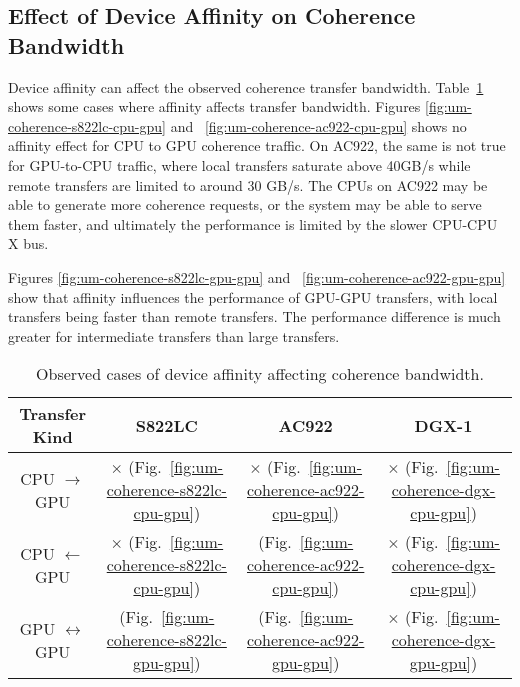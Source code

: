 \subsection{Effect of Device Affinity on Coherence Bandwidth}

Device affinity can affect the observed coherence transfer bandwidth.
Table~\ref{tab:um-coherence-affinity} shows some cases where affinity affects transfer bandwidth.
Figures \ref{fig:um-coherence-s822lc-cpu-gpu} and ~\ref{fig:um-coherence-ac922-cpu-gpu} shows no affinity effect for CPU to GPU coherence traffic.
On AC922, the same is not true for GPU-to-CPU traffic, where local transfers saturate above 40GB/s while remote transfers are limited to around 30 GB/s.
The CPUs on AC922 may be able to generate more coherence requests, or the system may be able to serve them faster, and ultimately the performance is limited by the slower CPU-CPU X bus.

Figures \ref{fig:um-coherence-s822lc-gpu-gpu} and ~\ref{fig:um-coherence-ac922-gpu-gpu} show that affinity influences the performance of GPU-GPU transfers, with local transfers being faster than remote transfers.
The performance difference is much greater for intermediate transfers than large transfers.

\begin{table}[ht]
	\centering
	\caption[Device Affinity and Coherence Bandwidth]{
		Observed cases of device affinity affecting coherence bandwidth.
	}
	\label{tab:um-coherence-affinity}
	\begin{tabular}{|c|c|c|c|}
		\hline
		\textbf{Transfer Kind}    & \textbf{S822LC}                                         & \textbf{AC922}                                         & \textbf{DGX-1}                            \\ \hline 
		CPU $\rightarrow$     GPU & $\times$   (Fig.~\ref{fig:um-coherence-s822lc-cpu-gpu}) & $\times$   (Fig.~\ref{fig:um-coherence-ac922-cpu-gpu}) & $\times$ (Fig.~\ref{fig:um-coherence-dgx-cpu-gpu}) \\ \hline
		CPU $\leftarrow$      GPU & $\times$   (Fig.~\ref{fig:um-coherence-s822lc-cpu-gpu}) & \checkmark (Fig.~\ref{fig:um-coherence-ac922-cpu-gpu}) & $\times$ (Fig.~\ref{fig:um-coherence-dgx-cpu-gpu}) \\ \hline
		GPU $\leftrightarrow$ GPU & \checkmark (Fig.~\ref{fig:um-coherence-s822lc-gpu-gpu}) & \checkmark (Fig.~\ref{fig:um-coherence-ac922-gpu-gpu}) & $\times$ (Fig.~\ref{fig:um-coherence-dgx-gpu-gpu}) \\ \hline
	\end{tabular}
\end{table}


